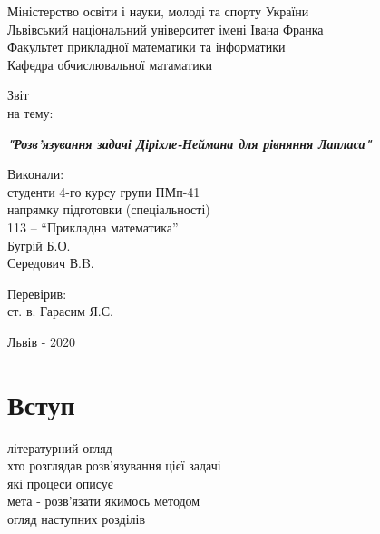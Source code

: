 \documentclass[14pt,a4paper]{extarticle}
\newcounter{e}
\newcounter{tabl}
\begin{document}
	

 \thispagestyle{empty}

 \begin{center}
	\large
	Міністерство освіти і науки, молоді та спорту України \\
	Львівський національний університет імені Івана Франка \\
	Факультет прикладної математики та інформатики \\
	Кафедра обчислювальної матаматики
 \end{center}

 \vspace{45pt}

 \vfill

 \begin{center}
	{\Huge{Звіт}}\\
	{\large на тему:}
 \end{center}

 \begin{center}\Large
	\textbf{\emph{"Розв'язування задачі Діріхле-Неймана для рівняння Лапласа"}}
 \end{center}

 \vfill
 \vskip100pt

 \begin{flushleft}
	\hskip8cm 
	Виконали:
	\\ \hskip8cm 
	студенти 4-го курсу групи ПМп-41
	\\ \hskip8cm
	напрямку підготовки (спеціальності)
	\\ \hskip8cm
	113 -- ``Прикладна математика''
	\\ \hskip8cm
	Бугрій Б.О.
	\\ \hskip8cm
	Середович В.B.
 \end{flushleft}

 \begin{flushleft}
	\hskip8cm 
	Перевірив:
	\\ \hskip8cm
	ст. в. Гарасим Я.С.
 \end{flushleft}

 \vfill

 \begin{center}
	\large
	Львів - 2020
 \end{center}

 \newpage
 \thispagestyle{empty}
 \tableofcontents

 \newpage
 \thispagestyle{empty}
 \section*{Вступ}
 \begin{center}\end{center}
 літературний огляд \\
 хто розглядав розв'язування цієї задачі \\
 які процеси описує \\
 мета - розв'язати якимось методом \\
 огляд наступних розділів
\end{document}
